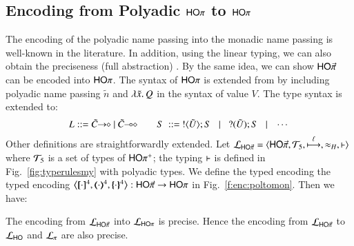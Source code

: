 \subsection{Encoding from Polyadic $\mathsf{HO}\pi$ to $\mathsf{HO}\pi$}
\label{subsec:pho}
\noi The encoding of the polyadic name passing 
into the monadic name passing is well-known in the literature.    
In addition, using the linear typing, 
we can also obtain the preciseness (full abstraction) \cite{Yoshida96}.
By the same idea, we can show $\mathsf{HO}\vec{\pi}$ can be encoded into $\mathsf{HO}\pi$. 
The syntax of 
$\mathsf{HO}\pi$ is extended from \HOp by including 
polyadic name passing $\tilde{n}$ and $\lambda \tilde{x}.\,Q$ in the syntax 
of value $V$. The type syntax is extended to: 
\[
L ::= \shot{\tilde{C}} \ | \ \lhot{\tilde{C}}
\quad\quad S \ ::= \  \btout{\tilde{U}} S \bnfbar \btinp{\tilde{U}} S \bnfbar \cdots 
\]
Other definitions are straightforwardly extended. 
Let $\tyl{L}_{\PHOp}=\calc{\PHOp}{{\cal{T}}_5}{\hby{\ell}}{\wb_H}{\proves}$
where 
${\cal{T}}_5$ is a set of types of $\mathsf{HO\pi^{+}}$;  
the typing $\vdash$ is defined in 
Fig.~\ref{fig:typerulesmy} with polyadic types. 
We define the typed encoding 
the typed encoding $\enco{\map{\cdot}^{4}, \mapt{\cdot}^{4}, \mapa{\cdot}^{4}}: \PHOp \to \HOp$ 
in Fig.~\ref{f:enc:poltomon}. 
Then we have:

\smallskip 

\begin{theorem}
\label{f:enc:hopiptohopi}
The encoding from $\mathcal{L}_{\mathsf{HO}\vec{\pi}}$ into $\mathcal{L}_{\mathsf{HO}\pi}$ 
is precise. Hence the encoding 
from $\mathcal{L}_{\mathsf{HO}\vec{\pi}}$ to 
$\mathcal{L}_{\mathsf{HO}}$ 
and $\mathcal{L}_{\pi}$ 
are also precise. 
\end{theorem}

